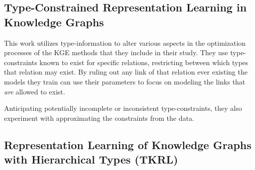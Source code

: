 

\subsection{
    Type-Constrained Representation Learning in Knowledge Graphs
    \texorpdfstring{\\ \citep{krompas_type_constrained_2015}}{}
}
This work utilizes type-information to alter various aspects in the optimization processes of the KGE methods that they include in their study. They use type-constraints known to exist for specific relations, restricting between which types that relation may exist. By ruling out any link of that relation ever existing the models they train can use their parameters to focus on modeling the links that \textit{are} allowed to exist.

Anticipating potentially incomplete or inconsistent type-constraints, they also experiment with approximating the constraints from the data.


\subsection{Representation Learning of Knowledge Graphs with Hierarchical Types (TKRL) \texorpdfstring{\citep{xie2016representation}}{}}

